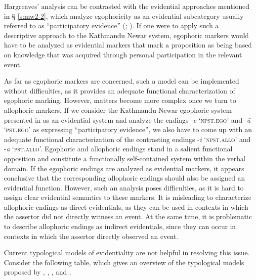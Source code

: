 \documentclass[output=paper]{langsci/langscibook}
\begin{document}
Hargreaves’ analysis can be contrasted with the evidential approaches mentioned in § \ref{s:mw2-2}, which analyze egophoricity as an evidential subcategory usually referred to as “participatory evidence” (\citealt{Plungian2010}; \citealt{SanRoqueLoughnane2012}). If one were to apply such a descriptive approach to the Kathmandu Newar system, egophoric markers would have to be analyzed as evidential markers that mark a proposition as being based on knowledge that was acquired through personal participation in the relevant event.

As far as egophoric markers are concerned, such a model can be implemented without difficulties, as it provides an adequate functional characterization of egophoric marking. However, matters become more complex once we turn to allophoric markers. If we consider the Kathmandu Newar egophoric system presented in  as an evidential system and analyze the endings -\textit{e} ‘\textsc{npst.ego}’ and -\textit{ā} ‘\textsc{pst.ego}’ as expressing “participatory evidence”, we also have to come up with an adequate functional characterization of the contrasting endings -\textit{i} ‘\textsc{npst.allo}’ and -\textit{a} ‘\textsc{pst.allo}’. Egophoric and allophoric endings stand in a salient functional opposition and constitute a functionally self-contained system within the verbal domain. If the egophoric endings are analyzed as evidential markers, it appears conclusive that the corresponding allophoric endings should also be assigned an evidential function. However, such an analysis poses difficulties, as it is hard to assign clear evidential semantics to these markers. It is misleading to characterize allophoric endings as direct evidentials, as they can be used in contexts in which the assertor did not directly witness an event. At the same time, it is problematic to describe allophoric endings as indirect evidentials, since they can occur in contexts in which the assertor directly observed an event.

Current typological models of evidentiality are not helpful in resolving this issue. Consider the following table, which gives an overview of the typological models proposed by \cite{Aikhenvald2004}, \cite{Plungian2010}, \cite{SanRoqueLoughnane2012}, and \cite{Hengeveld2015}.
\end{document}
